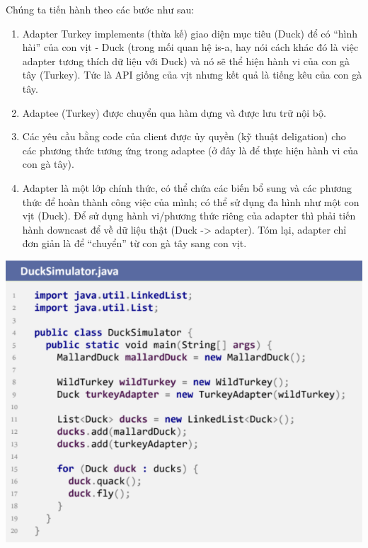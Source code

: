 Chúng ta tiến hành theo các bước như sau:
\begin{enumerate}
\item Adapter Turkey implements (thừa kế) giao diện mục tiêu (Duck) để có “hình hài” của con vịt - Duck (trong mối quan hệ is-a, hay nói cách khác đó là việc adapter tương thích dữ liệu với Duck) và nó sẽ thể hiện hành vi của con gà tây (Turkey). Tức là API giống của vịt nhưng kết quả là tiếng kêu của con gà tây.
\item Adaptee (Turkey) được chuyển qua hàm dựng và được lưu trữ nội bộ.
\item Các yêu cầu bằng code của client được ủy quyền (kỹ thuật deligation) cho các phương thức tương ứng trong adaptee (ở đây là để thực hiện hành vi của con gà tây).
\item Adapter là một lớp chính thức, có thể chứa các biến bổ sung và các phương thức để hoàn thành công việc của mình; có thể sử dụng đa hình như một con vịt (Duck). Để sử dụng hành vi/phương thức riêng của adapter thì phải tiến hành downcast để về dữ liệu thật (Duck -> adapter). Tóm lại, adapter chỉ đơn giản là để “chuyển” từ con gà tây sang con vịt.
\end{enumerate}
\begin{center}
\includegraphics{GALLEYS/images/chapter6/code4}
\end{center}